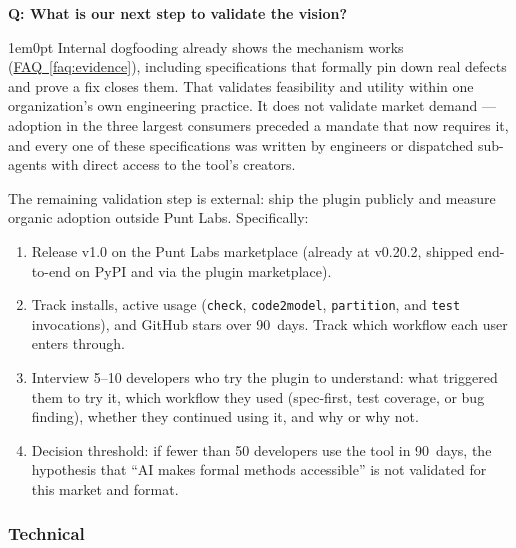 \documentclass[11pt,letterpaper]{article}
\newcounter{faqnum}
\newenvironment{faqpair}[1]{%
  \needspace{4\baselineskip}%
  \vspace{0.5em}%
  \refstepcounter{faqnum}%
  \noindent\textbf{\color{SectionBlue}Q\thefaqnum: #1}\par\nopagebreak[4]%
  \vspace{0.2em}%
  \begin{adjustwidth}{1em}{0pt}%
  \setlength{\parindent}{0pt}%
}{%
  \end{adjustwidth}%
  \vspace{0.5em}%
}
\newcommand{\faqref}[1]{\hyperref[#1]{FAQ~\ref*{#1}}}
\begin{document}
\begin{faqpair}{What is our next step to validate the vision?}\label{faq:validation}
Internal dogfooding already shows the mechanism works (\faqref{faq:evidence}), including specifications that formally pin down real defects and prove a fix closes them. That validates feasibility and utility within one organization's own engineering practice. It does not validate market demand --- adoption in the three largest consumers preceded a mandate that now requires it, and every one of these specifications was written by engineers or dispatched sub-agents with direct access to the tool's creators.

The remaining validation step is external: ship the plugin publicly and measure organic adoption outside Punt Labs. Specifically:

\begin{enumerate}[nosep]
\item Release v1.0 on the Punt Labs marketplace (already at v0.20.2, shipped end-to-end on PyPI and via the plugin marketplace).
\item Track installs, active usage (\texttt{check}, \texttt{code2model}, \texttt{partition}, and \texttt{test} invocations), and GitHub stars over 90~days. Track which workflow each user enters through.
\item Interview 5--10 developers who try the plugin to understand: what triggered them to try it, which workflow they used (spec-first, test coverage, or bug finding), whether they continued using it, and why or why not.
\item Decision threshold: if fewer than 50 developers use the tool in 90~days, the hypothesis that ``AI makes formal methods accessible'' is not validated for this market and format.
\end{enumerate}
\end{faqpair}

\subsubsection*{Technical}
\end{document}
